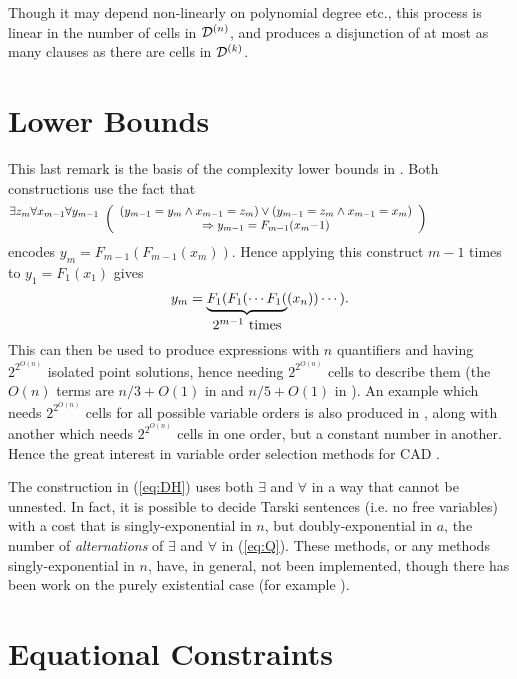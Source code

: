 \documentclass[runningheads,a4paper]{llncs}
\begin{document}
Though it may depend non-linearly on polynomial degree etc., this process is linear in the number of cells in ${\cal D}^{(n)}$, and produces a disjunction of at most as many clauses as there are cells in ${\cal D}^{(k)}$. 


\section{Lower Bounds}
\label{sec:LB}

This last remark is the basis of the complexity lower bounds in \cite{DavenportHeintz1988,BrownDavenport2007}. Both constructions use the fact that
\begin{equation}\label{eq:DH}
\exists z_m\forall x_{m-1}\forall y_{m-1}
\vtop{\vskip-2.0ex$\hskip-10pt\left( \begin{array}{c}
\left(y_{m-1}=y_m\land x_{m-1}=z_m\right)\lor\left(y_{m-1}=z_m\land x_{m-1}=x_m\right)\cr
\Rightarrow y_{m-1}=F_{m-1}(x_m{-1})\end{array}\right)$\hskip-100pt}
\end{equation}
encodes $y_m=F_{m-1}(F_{m-1}(x_m))$. Hence applying this construct $m-1$ times to $y_1=F_1(x_1)$ gives 
\[
y_m=\underbrace{F_1(F_1(\cdots F_1(}_{\hbox{$2^{m-1}$ times}}(x_n))\cdots).
\]
This can then be used to produce expressions with $n$ quantifiers and having $2^{2^{O(n)}}$ isolated point solutions, hence needing $2^{2^{O(n)}}$ cells to describe them (the $O(n)$ terms are $n/3+O(1)$ in \cite{BrownDavenport2007} and $n/5+O(1)$ in \cite{DavenportHeintz1988}). 
An example which needs  $2^{2^{O(n)}}$ cells for all possible variable orders is also 
produced in \cite{BrownDavenport2007}, along with another which needs $2^{2^{O(n)}}$ cells in one order, but a constant number in another.  Hence the great interest in variable order selection methods for CAD \cite[to name a few]{Dolzmannetal2004a,Englandetal2014c,Huangetal2014a}.
\par
The construction in (\ref{eq:DH}) uses both $\exists$ and $\forall$ in a way that cannot be unnested. In fact, it is possible \cite{Grigoriev1988} to decide Tarski sentences (i.e. no free variables) with a cost that is singly-exponential in $n$, but doubly-exponential in $a$, the number of \emph{alternations} of $\exists$ and $\forall$ in (\ref{eq:Q}). These methods, or any methods singly-exponential in $n$, have, in general, not been implemented, though there has been work on the purely existential case (for example \cite{Huntington2008a}).


\section{Equational Constraints}
\label{sec:EC}
\end{document}
